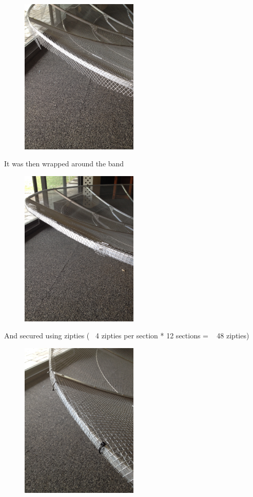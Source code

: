 \documentclass[11pt]{article} %
\begin{document}
\begin{figure}
  \centering
  \caption{   }
  \includegraphics[width=0.50\textwidth]{dish/17.jpeg}
\end{figure}

It was then wrapped around the band

\begin{figure}
  \centering
  \caption{   }
  \includegraphics[width=0.50\textwidth]{dish/18.jpeg}
\end{figure}


And secured using zipties (~ 4 zipties per section * 12 sections = ~ 48 zipties)


\begin{figure}
  \centering
  \caption{   }
  \includegraphics[width=0.50\textwidth]{dish/19.jpeg}
\end{figure}
\end{document}
